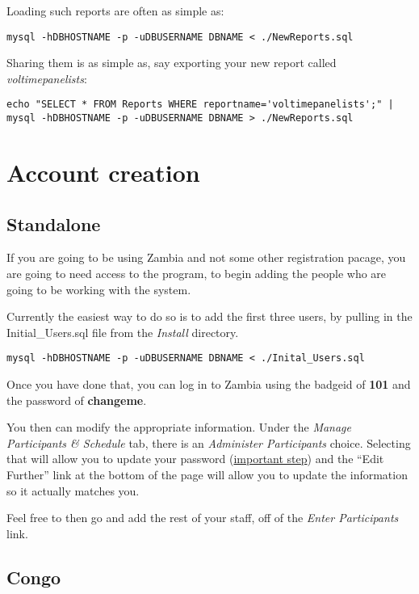 \documentclass[tablesignature]{scrartcl}
\begin{document}
  Loading such reports are often as simple as:
\begin{verbatim}
mysql -hDBHOSTNAME -p -uDBUSERNAME DBNAME < ./NewReports.sql
\end{verbatim}



  Sharing them is as simple as, say exporting your new report called
  \emph{voltimepanelists}:
\begin{verbatim}
echo "SELECT * FROM Reports WHERE reportname='voltimepanelists';" | 
mysql -hDBHOSTNAME -p -uDBUSERNAME DBNAME > ./NewReports.sql
\end{verbatim}
\section{Account creation}
\label{sec-7}
\subsection{Standalone}
\label{sec-7_1}

   If you are going to be using Zambia and not some other registration
   pacage, you are going to need access to the program, to begin
   adding the people who are going to be working with the system.

   Currently the easiest way to do so is to add the first three users,
   by pulling in the Initial\_{}Users.sql file from the \emph{Install}
   directory.

\begin{verbatim}
mysql -hDBHOSTNAME -p -uDBUSERNAME DBNAME < ./Inital_Users.sql
\end{verbatim}



   Once you have done that, you can log in to Zambia using the badgeid
   of \textbf{101} and the password of \textbf{changeme}.

   You then can modify the appropriate information.  Under the \emph{Manage    Participants \& Schedule} tab, there is an \emph{Administer Participants}
   choice.  Selecting that will allow you to update your password
   (\underline{important step}) and the ``Edit Further'' link at the bottom of
   the page will allow you to update the information so it actually
   matches you.

   Feel free to then go and add the rest of your staff, off of the
   \emph{Enter Participants} link.
\subsection{Congo}
\label{sec-7_2}
\end{document}
